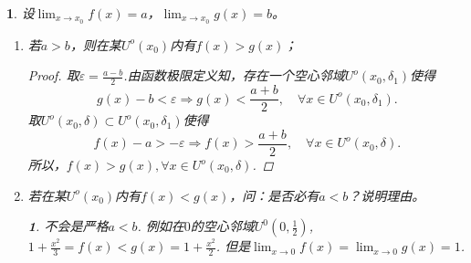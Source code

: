 \documentclass[utf8]{book}
\newtheorem{example}{}[section]             %
\newtheorem{solution}{}
\begin{document}
\begin{example}
设$\displaystyle\lim_{x\to x_0}f(x)=a$，$\displaystyle\lim_{x\to x_0}g(x)=b$。
\renewcommand\labelenumi{\normalfont(\theenumi)}
\begin{enumerate}
\item 若$a>b$，则在某$U^o(x_0)$内有$f(x)>g(x)$；
\begin{proof}取$\varepsilon = \displaystyle\frac{a-b}{2}$.由函数极限定义知，存在一个空心邻域$U^o(x_0,\delta_1)$使得
$$g(x)-b < \varepsilon \Rightarrow g(x) < \frac{a+b}{2}, \quad\forall x\in U^o(x_0,\delta_1).$$
取$U^o(x_0,\delta)\subset U^o(x_0,\delta_1)$使得
$$f(x)-a > -\varepsilon\Rightarrow f(x)>\frac{a+b}{2}, \quad\forall x\in U^o(x_0,\delta).$$
所以，$f(x)>g(x),\forall x\in U^o(x_0,\delta)$.
\end{proof}
\item 若在某$U^o(x_0)$内有$f(x)<g(x)$，问：是否必有$a<b$？说明理由。
\begin{solution}不会是严格$a<b$. 例如在$0$的空心邻域$U^0(0,\frac{1}{2})$, $1+\frac{x^2}{3}=f(x) < g(x) = 1+\frac{x^2}{2}$. 但是$\displaystyle\lim_{x\to 0}f(x)=\displaystyle\lim_{x\to 0}g(x)=1$.
\end{solution}
\end{enumerate}
\end{example}
\end{document}

